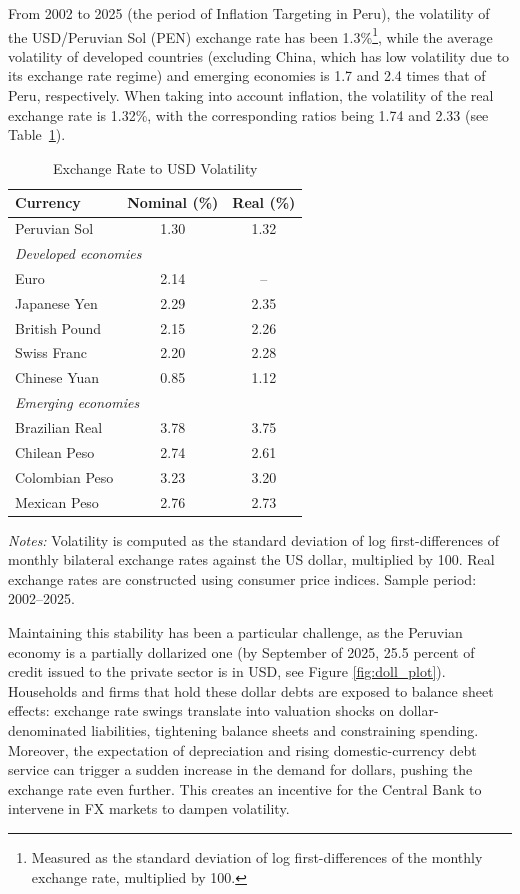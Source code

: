 \documentclass[12pt,a4paper]{article}
\begin{document}
From 2002 to 2025 (the period of Inflation Targeting in Peru), the volatility of the USD/Peruvian Sol (PEN) exchange rate has been 1.3\%\footnote{Measured as the standard deviation of log first-differences of the monthly exchange rate, multiplied by 100.}, while the average volatility of developed countries (excluding China, which has low volatility due to its exchange rate regime) and emerging economies is 1.7 and 2.4 times that of Peru, respectively. When taking into account inflation, the volatility of the real exchange rate is 1.32\%, with the corresponding ratios being 1.74 and 2.33 (see Table~\ref{tab:fx_volatility}).

\begin{table}[htbp]
  \centering
  \caption{Exchange Rate to USD Volatility}
  \label{tab:fx_volatility}
  \begin{tabular}{lcc}
    \toprule
    Currency & Nominal (\%) & Real (\%) \\
    \midrule
    Peruvian Sol  & 1.30 & 1.32 \\
    \midrule
    \multicolumn{3}{l}{\textit{Developed economies}} \\
    Euro          & 2.14 & -- \\
    Japanese Yen  & 2.29 & 2.35 \\
    British Pound & 2.15 & 2.26 \\
    Swiss Franc   & 2.20 & 2.28 \\
    Chinese Yuan  & 0.85 & 1.12 \\
    \midrule
    \multicolumn{3}{l}{\textit{Emerging economies}} \\
    Brazilian Real  & 3.78 & 3.75 \\
    Chilean Peso    & 2.74 & 2.61 \\
    Colombian Peso  & 3.23 & 3.20 \\
    Mexican Peso    & 2.76 & 2.73 \\
    \midrule
    \bottomrule
  \end{tabular}
  \smallskip
  \begin{minipage}{\linewidth}
    \small
    \textit{Notes:} Volatility is computed as the standard deviation of log
    first-differences of monthly bilateral exchange rates against the US dollar,
    multiplied by 100. Real exchange rates are constructed using consumer price
    indices. Sample period: 2002--2025.
  \end{minipage}
\end{table}

Maintaining this stability has been a particular challenge, as the Peruvian economy is a partially dollarized one (by September of 2025, 25.5 percent of credit issued to the private sector is in USD, see Figure \ref{fig:doll_plot}). Households and firms that hold these dollar debts are exposed to balance sheet effects: exchange rate swings translate into valuation shocks on dollar-denominated liabilities, tightening balance sheets and constraining spending. Moreover, the expectation of depreciation and rising domestic-currency debt service can trigger a sudden increase in the demand for dollars, pushing the exchange rate even further. This creates an incentive for the Central Bank to intervene in FX markets to dampen volatility.
\end{document}
